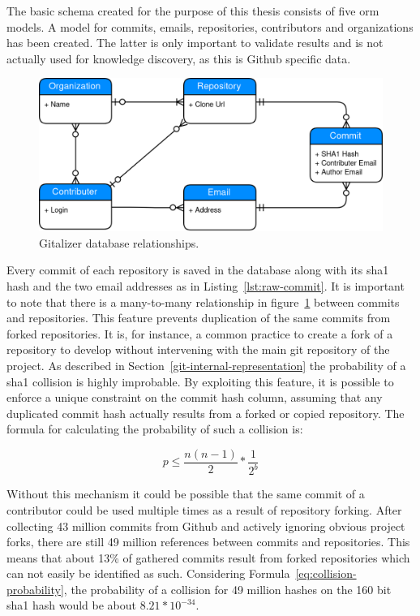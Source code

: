 The basic schema created for the purpose of this thesis consists of five \ac{orm} models.
A model for commits, emails, repositories, contributors and organizations has been created.
The latter is only important to validate results and is not actually used for knowledge discovery, as this is Github specific data.

\begin{figure}[H]
\includegraphics[scale=0.3]{./graphs/gitalizer-data-structure}
\centering
\caption{Gitalizer database relationships.}\label{fig:gitalizer-relationship}
\end{figure}

Every commit of each repository is saved in the database along with its \ac{sha1} hash and the two email addresses as in Listing~\ref{lst:raw-commit}.
It is important to note that there is a many-to-many relationship in figure~\ref{fig:gitalizer-relationship} between commits and repositories.
This feature prevents duplication of the same commits from forked repositories.
It is, for instance, a common practice to create a fork of a repository to develop without intervening with the main git repository of the project.
As described in Section~\ref{git-internal-representation} the probability of a \ac{sha1} collision is highly improbable.
By exploiting this feature, it is possible to enforce a unique constraint on the commit hash column, assuming that any duplicated commit hash actually results from a forked or copied repository.
The formula for calculating the probability of such a collision is:

\begin{equation}\label{eq:collision-probability}
    p \leq \frac{n(n-1)}{2} * \frac{1}{2^{b}}
\end{equation}

Without this mechanism it could be possible that the same commit of a contributor could be used multiple times as a result of repository forking.
After collecting 43 million commits from Github and actively ignoring obvious project forks, there are still 49 million references between commits and repositories.
This means that about 13\% of gathered commits result from forked repositories which can not easily be identified as such.
Considering Formula~\ref{eq:collision-probability}, the probability of a collision for 49 million hashes on the 160 bit \ac{sha1} hash would be about $8.21 * 10^{-34}$.

